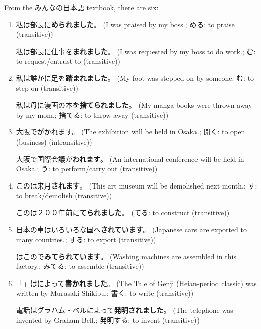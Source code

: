 \documentclass[../nihongo-gakushuu-kyouzai.tex]{subfiles}
\begin{document}
From the みんなの日本語 textbook, there are six:
\begin{enumerate}[label=\arabic*.]
    \item 私は部長に\textbf{められました}。 (I was praised by my boss.; める: to praise (transitive))

    私は部長に仕事を\textbf{まれました}。 (I was requested by my boss to do work.; む: to request/entrust to (transitive))

    \item 私は誰かに足を\textbf{踏まれました}。 (My foot was stepped on by someone. む: to step on (transitive))

    私は母に漫画の本を\textbf{捨てられました}。 (My manga books were thrown away by my mom.; 捨てる: to throw away (transitive))

    \item 大阪でがかれます。 (The exhibition will be held in Osaka.; 開く: to open (business) (intransitive))

    大阪で国際会議が\textbf{われます}。 (An international conference will be held in Osaka.; う: to perform/carry out (transitive))

    \item このは来月\textbf{されます}。 (This art museum will be demolished next month.; す: to break/demolish (transitive))

    このは２００年前に\textbf{てられました}。 (てる: to construct (transitive))

    \item 日本の車はいろいろな国へ\textbf{されています}。 (Japanese cars are exported to many countries.; する: to export (transitive))

    はこので\textbf{みてられています}。 (Washing machines are assembled in this factory.; みてる: to assemble (transitive))

    \item 「」はによって\textbf{書かれました}。 (The Tale of Genji (Heian-period classic) was written by Murasaki Shikibu.; 書く: to write (transitive))

    電話はグラハム・ベルによって\textbf{発明されました}。 (The telephone was invented by Graham Bell.; 発明する: to invent (transitive))
\end{enumerate}
\end{document}
